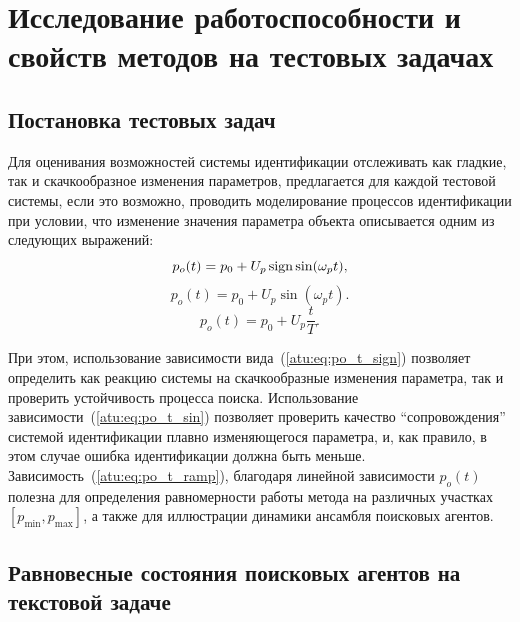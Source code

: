 




\section{Исследование работоспособности и свойств методов на тестовых задачах}  %

\subsection{Постановка тестовых задач}

Для оценивания возможностей системы идентификации
отслеживать как гладкие, так и скачкообразное изменения параметров,
предлагается для каждой тестовой системы, если это возможно,
проводить моделирование процессов идентификации при условии, что
изменение значения параметра объекта описывается одним из
следующих выражений:
%
\begin{equation}
  p_o(t) = p_0 +  U_{p} \operatorname*{sign} \sin( \omega_{p} t ),
  \label{atu:eq:po_t_sign}
\end{equation}
%
%
\begin{equation}
  p_o(t) = p_0 +  U_{p} \sin( \omega_{p} t ).
  \label{atu:eq:po_t_sin}
\end{equation}
%
\begin{equation}
  p_o(t) = p_0 +  U_{p} \frac{t}{T}.
  \label{atu:eq:po_t_ramp}
\end{equation}


При этом, использование зависимости вида~(\ref{atu:eq:po_t_sign})
позволяет определить как реакцию системы на скачкообразные
изменения параметра, так и проверить устойчивость процесса поиска.
Использование зависимости~(\ref{atu:eq:po_t_sin}) позволяет проверить
качество ``сопровождения'' системой идентификации плавно изменяющегося параметра,
и, как правило, в этом случае ошибка идентификации должна быть меньше.
Зависимость~(\ref{atu:eq:po_t_ramp}), благодаря линейной зависимости $p_o(t)$
полезна для определения
равномерности работы метода на различных участках $[p_{\min}, p_{\max}]$,
а также для иллюстрации динамики ансамбля поисковых агентов.



\subsection{Равновесные состояния поисковых агентов на текстовой задаче}  %

